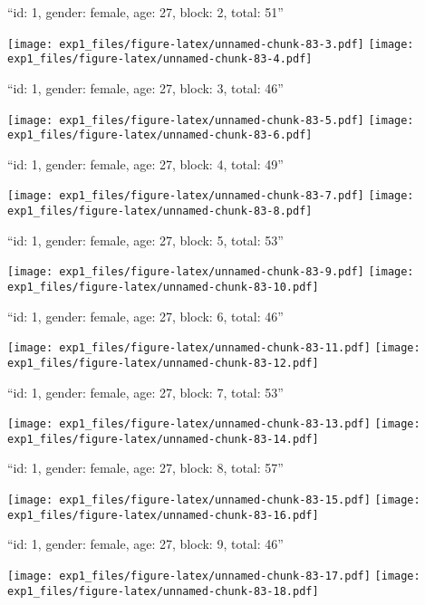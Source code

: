 \documentclass[11pt,,]{article}
\begin{document}
\newpage
[1] 

``id: 1, gender: female, age: 27, block: 2, total: 51''

\texttt{[image: exp1\_files/figure-latex/unnamed-chunk-83-3.pdf]}
\texttt{[image: exp1\_files/figure-latex/unnamed-chunk-83-4.pdf]}

\newpage
[1] 

``id: 1, gender: female, age: 27, block: 3, total: 46''

\texttt{[image: exp1\_files/figure-latex/unnamed-chunk-83-5.pdf]}
\texttt{[image: exp1\_files/figure-latex/unnamed-chunk-83-6.pdf]}

\newpage
[1] 

``id: 1, gender: female, age: 27, block: 4, total: 49''

\texttt{[image: exp1\_files/figure-latex/unnamed-chunk-83-7.pdf]}
\texttt{[image: exp1\_files/figure-latex/unnamed-chunk-83-8.pdf]}

\newpage
[1] 

``id: 1, gender: female, age: 27, block: 5, total: 53''

\texttt{[image: exp1\_files/figure-latex/unnamed-chunk-83-9.pdf]}
\texttt{[image: exp1\_files/figure-latex/unnamed-chunk-83-10.pdf]}

\newpage
[1] 

``id: 1, gender: female, age: 27, block: 6, total: 46''

\texttt{[image: exp1\_files/figure-latex/unnamed-chunk-83-11.pdf]}
\texttt{[image: exp1\_files/figure-latex/unnamed-chunk-83-12.pdf]}

\newpage
[1] 

``id: 1, gender: female, age: 27, block: 7, total: 53''

\texttt{[image: exp1\_files/figure-latex/unnamed-chunk-83-13.pdf]}
\texttt{[image: exp1\_files/figure-latex/unnamed-chunk-83-14.pdf]}

\newpage
[1] 

``id: 1, gender: female, age: 27, block: 8, total: 57''

\texttt{[image: exp1\_files/figure-latex/unnamed-chunk-83-15.pdf]}
\texttt{[image: exp1\_files/figure-latex/unnamed-chunk-83-16.pdf]}

\newpage
[1] 

``id: 1, gender: female, age: 27, block: 9, total: 46''

\texttt{[image: exp1\_files/figure-latex/unnamed-chunk-83-17.pdf]}
\texttt{[image: exp1\_files/figure-latex/unnamed-chunk-83-18.pdf]}

\newpage
[1] 
\end{document}
